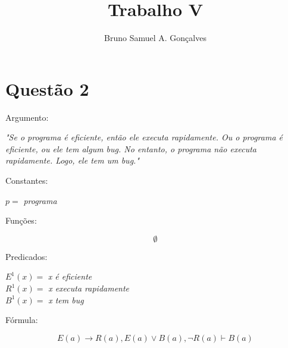 \documentclass[12pt]{article}
\title{Trabalho V}
\author{Bruno Samuel A. Gonçalves}
\date{}
\begin{document}
\maketitle
\thispagestyle{empty}

\section{Questão 2}

\noindent Argumento:

\begin{center}
    \textit{"Se o programa é eficiente, então ele executa rapidamente. Ou o programa é eficiente, ou ele tem algum bug. No entanto, o programa não executa rapidamente. Logo, ele tem um bug."}
\end{center}

\noindent Constantes:

\begin{center}
    $p =$ \textit{programa}
\end{center}

\noindent Funções:

\[
    \emptyset
\]

\noindent Predicados:

\begin{center}
    $E^1(x) =$ \textit{x é eficiente} \\
    $R^1(x) =$ \textit{x executa rapidamente}  \\
    $B^1(x) =$ \textit{x tem bug}
\end{center}

\noindent Fórmula:

\[ 
    E(a) \to R(a),
    E(a) \lor B(a),
    \neg R(a)
    \vdash
    B(a)
\]
\end{document}
